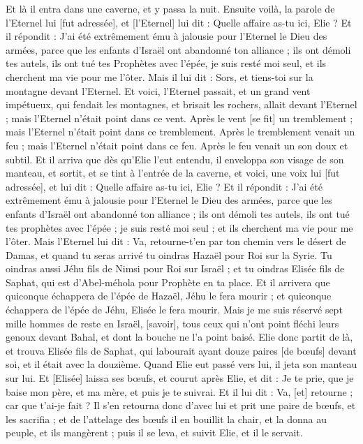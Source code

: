 \begin{multicols}{2}
Et là il entra dans une caverne, et y passa la nuit. Ensuite voilà, la parole de l'Eternel lui [fut adressée], et [l'Eternel] lui dit : Quelle affaire as-tu ici, Elie ?
Et il répondit : J'ai été extrêmement ému à jalousie pour l'Eternel le Dieu des armées, parce que les enfants d'Israël ont abandonné ton alliance ; ils ont démoli tes autels, ils ont tué tes Prophètes avec l'épée, je suis resté moi seul, et ils cherchent ma vie pour me l'ôter.
Mais il lui dit : Sors, et tiens-toi sur la montagne devant l'Eternel. Et voici, l'Eternel passait, et un grand vent impétueux, qui fendait les montagnes, et brisait les rochers, allait devant l'Eternel ; mais l'Eternel n'était point dans ce vent. Après le vent [se fit] un tremblement ; mais l'Eternel n'était point dans ce tremblement.
Après le tremblement venait un feu ; mais l'Eternel n'était point dans ce feu. Après le feu venait un son doux et subtil.
Et il arriva que dès qu'Elie l'eut entendu, il enveloppa son visage de son manteau, et sortit, et se tint à l'entrée de la caverne, et voici, une voix lui [fut adressée], et lui dit : Quelle affaire as-tu ici, Elie ?
Et il répondit : J'ai été extrêmement ému à jalousie pour l'Eternel le Dieu des armées, parce que les enfants d'Israël ont abandonné ton alliance ; ils ont démoli tes autels, ils ont tué tes prophètes avec l'épée ; je suis resté moi seul ; et ils cherchent ma vie pour me l'ôter.
Mais l'Eternel lui dit : Va, retourne-t'en par ton chemin vers le désert de Damas, et quand tu seras arrivé tu oindras Hazaël pour Roi sur la Syrie.
Tu oindras aussi Jéhu fils de Nimsi pour Roi sur Israël ; et tu oindras Elisée fils de Saphat, qui est d'Abel-méhola pour Prophète en ta place.
Et il arrivera que quiconque échappera de l'épée de Hazaël, Jéhu le fera mourir ; et quiconque échappera de l'épée de Jéhu, Elisée le fera mourir.
Mais je me suis réservé sept mille hommes de reste en Israël, [savoir], tous ceux qui n'ont point fléchi leurs genoux devant Bahal, et dont la bouche ne l'a point baisé.
Elie donc partit de là, et trouva Elisée fils de Saphat, qui labourait ayant douze paires [de bœufs] devant soi, et il était avec la douzième. Quand Elie eut passé vers lui, il jeta son manteau sur lui.
Et [Elisée] laissa ses bœufs, et courut après Elie, et dit : Je te prie, que je baise mon père, et ma mère, et puis je te suivrai. Et il lui dit : Va, [et] retourne ; car que t'ai-je fait ?
Il s'en retourna donc d'avec lui et prit une paire de bœufs, et les sacrifia ; et de l'attelage des bœufs il en bouillit la chair, et la donna au peuple, et ils mangèrent ; puis il se leva, et suivit Elie, et il le servait.

\end{multicols}
